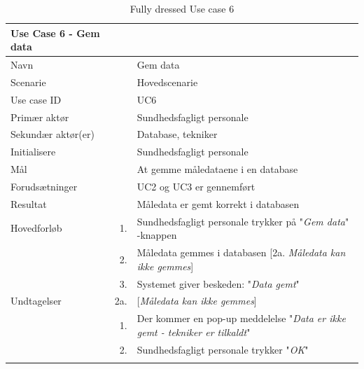 
\begin{longtabu} to 
\toprule
    {\large \textbf{Use Case 6 - Gem data}} && \\
    \toprule
    Navn &&    Gem data\\
    Scenarie &&    Hovedscenarie\\
    Use case ID &&    UC6\\
    Primær aktør &&    Sundhedsfagligt personale\\
    Sekundær aktør(er) &&    Database, tekniker\\
    Initialisere &&    Sundhedsfagligt personale\\
    Mål &&    At gemme måledataene i en database\\
    Forudsætninger &&    UC2 og UC3 er gennemført\\
    Resultat &&    Måledata er gemt korrekt i databasen\\
    \toprule
    Hovedforløb &    1. &    Sundhedsfagligt personale trykker på "\textit{Gem data}"\- -knappen\\[-1ex]
                &    2. &    Måledata gemmes i databasen\newline
                             [2a. \textit{Måledata kan ikke gemmes}]\\[-1ex]
                &    3. &    Systemet giver beskeden: "\textit{Data gemt}"\\[-1ex]
                             \toprule
    Undtagelser &    2a. &    [\textit{Måledata kan ikke gemmes}]\\[-1ex]
    &	1.	&	Der kommer en pop-up meddelelse "\textit{Data er ikke gemt - tekniker er tilkaldt}"\\[-1ex]
    &	2.	&	Sundhedsfagligt personale trykker "\textit{OK}"\\[-1ex]
                \toprule
\caption{Fully dressed Use case 6}
\label{UC6}
\end{longtabu}
\newpage

